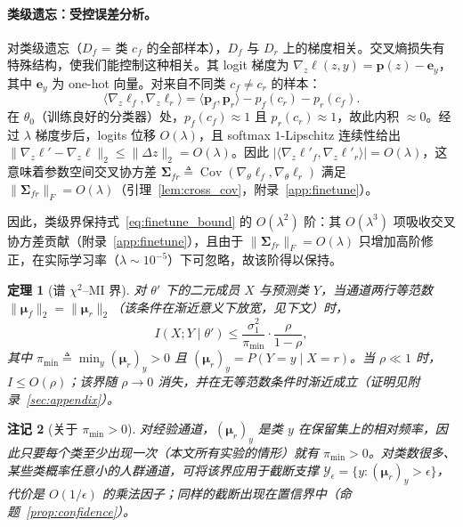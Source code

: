 \documentclass[11pt,a4paper]{article}
\newtheorem{theorem}{定理}[section]
\newtheorem{remark}[theorem]{注记}
\newcommand{\coloneqq}{\triangleq}
\begin{document}
\paragraph{类级遗忘：受控误差分析。}
对类级遗忘（$D_f$ = 类 $c_f$ 的全部样本），$D_f$ 与 $D_r$ 上的梯度相关。交叉熵损失有特殊结构，使我们能控制这种相关。其 logit 梯度为 $\nabla_z\ell(z,y)=\mathbf{p}(z)-\mathbf{e}_y$，其中 $\mathbf{e}_y$ 为 one-hot 向量。对来自不同类 $c_f\neq c_r$ 的样本：
\begin{equation}
\langle\nabla_z\ell_f,\nabla_z\ell_r\rangle = \langle\mathbf{p}_f,\mathbf{p}_r\rangle - p_f(c_r) - p_r(c_f).
\end{equation}
在 $\theta_0$（训练良好的分类器）处，$p_f(c_f){\approx}1$ 且 $p_r(c_r){\approx}1$，故此内积 $\approx0$。经过 $\lambda$ 梯度步后，logits 位移 $O(\lambda)$，且 softmax $1$-Lipschitz 连续性给出 $\|\nabla_z\ell' - \nabla_z\ell\|_2\le\|\Delta z\|_2 = O(\lambda)$。因此 $|\langle\nabla_z\ell'_f,\nabla_z\ell'_r\rangle| = O(\lambda)$，这意味着参数空间交叉协方差 $\boldsymbol{\Sigma}_{fr} \coloneqq \operatorname{Cov}(\nabla_\theta\ell_f,\nabla_\theta\ell_r)$ 满足 $\|\boldsymbol{\Sigma}_{fr}\|_F = O(\lambda)$（引理~\ref{lem:cross_cov}，附录~\ref{app:finetune}）。

因此，类级界保持式~\eqref{eq:finetune_bound} 的 $O(\lambda^2)$ 阶：其 $O(\lambda^3)$ 项吸收交叉协方差贡献（附录~\ref{app:finetune}），且由于 $\|\boldsymbol{\Sigma}_{fr}\|_F = O(\lambda)$ 只增加高阶修正，在实际学习率（$\lambda{\sim}10^{-5}$）下可忽略，故该阶得以保持。

\begin{theorem}[谱 $\chi^2$--MI 界]
\label{thm:mi_bound}
对 $\theta'$ 下的二元成员 $X$ 与预测类 $Y$，当通道两行等范数 $\|\boldsymbol{\mu}_f\|_2=\|\boldsymbol{\mu}_r\|_2$（该条件在渐近意义下放宽，见下文）时，
\begin{equation}
I(X; Y \mid \theta') \le \frac{\sigma_1^2}{\pi_{\min}}\cdot\frac{\rho}{1-\rho},
\end{equation}
其中 $\pi_{\min} \coloneqq \min_y (\boldsymbol{\mu}_r)_y > 0$ 且 $(\boldsymbol{\mu}_r)_y=P(Y{=}y\mid X{=}r)$。当 $\rho\ll 1$ 时，$I \le O(\rho)$；该界随 $\rho\to0$ 消失，并在无等范数条件时渐近成立（证明见附录~\ref{sec:appendix}）。
\end{theorem}

\begin{remark}[关于 $\pi_{\min}>0$]
\label{rem:pi_min}
对经验通道，$(\boldsymbol{\mu}_r)_y$ 是类 $y$ 在保留集上的相对频率，因此只要每个类至少出现一次（本文所有实验的情形）就有 $\pi_{\min}>0$。对类数很多、某些类概率任意小的人群通道，可将该界应用于截断支撑 $\mathcal{Y}_\epsilon=\{y:(\boldsymbol{\mu}_r)_y>\epsilon\}$，代价是 $O(1/\epsilon)$ 的乘法因子；同样的截断出现在置信界中（命题~\ref{prop:confidence}）。
\end{remark}
\end{document}
